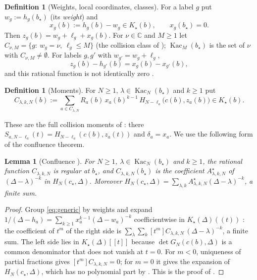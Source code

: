 \documentclass[11pt]{article}
\newtheorem{lemma}[theorem]{Lemma}
\theoremstyle{definition}
\newtheorem{definition}[theorem]{Definition}
\theoremstyle{remark}
\newcommand{\Kac}{\operatorname{Kac}}
\begin{document}
\begin{definition}[Weights, local coordinates, classes]
For a label $g$ put $w_g:=h_g(b_\star)$ (its \emph{weight}) and
\[
 x_g(b):=h_g(b)-w_g\in K_\star(b),\qquad x_g(b_\star)=0 .
\]
Then $z_g(b)=w_g+\ell_g+x_g(b)$.  For $\nu\in\mathbb C$ and $M\ge1$ let
$C_{\nu,M}=\{g:\ w_g=\nu,\ \ell_g\le M\}$ (the collision class of
\cite[Definition~3.1]{CP}); $\Kac_M(b_\star)$ is the set of $\nu$ with
$C_{\nu,M}\ne\emptyset$.  For labels $g,g'$ with $w_{g'}=w_g+\ell_g$,
\begin{equation}\label{eq:link}
 z_g(b)-h_{g'}(b)=x_g(b)-x_{g'}(b),
\end{equation}
and this rational function is not identically zero \cite[Lemma~6.3]{CP}.
\end{definition}

\begin{definition}[Moments]
For $N\ge1$, $\lambda\in\Kac_N(b_\star)$ and $k\ge1$ put
\[
 C_{\lambda,k,N}(b):=\sum_{a\in C_{\lambda,N}}R_a(b)\,x_a(b)^{k-1}\,
 H_{N-\ell_a}\bigl(c(b),z_a(b)\bigr)\in K_\star(b).
\]
\end{definition}

These are the full collision moments of \cite[Definition~7.2 and proof of
Theorem~7.3]{CP}: there $S_{a,N-\ell_a}(t)=H_{N-\ell_a}(c(b),z_a(t))$ and
$\delta_a=x_a$.  We use the following form of the confluence theorem.

\begin{lemma}[Confluence {\cite[Theorem~7.3]{CP}}]\label{lem:conf}
For $N\ge1$, $\lambda\in\Kac_N(b_\star)$ and $k\ge1$, the rational function
$C_{\lambda,k,N}$ is regular at $b_\star$, and $C_{\lambda,k,N}(b_\star)$ is the
coefficient $A^\star_{\lambda,k,N}$ of $(\Delta-\lambda)^{-k}$ in
$H_N(c_\star,\Delta)$.  Moreover
$H_N(c_\star,\Delta)=\sum_{\lambda,k}A^\star_{\lambda,k,N}(\Delta-\lambda)^{-k}$, a
finite sum.
\end{lemma}

\begin{proof}
Group \eqref{eq:generic} by weights and expand
$1/(\Delta-h_a)=\sum_{k\ge1}x_a^{k-1}(\Delta-w_a)^{-k}$ coefficientwise in
$K_\star(\Delta)((t))$ \cite[Lemma~7.4]{CP}: the coefficient of $t^m$ of the right
side is $\sum_\lambda\sum_k[t^m]C_{\lambda,k,N}\,(\Delta-\lambda)^{-k}$, a finite
sum.  The left side lies in $K_\star(\Delta)[[t]]$ because $\det G_N(c(b),\Delta)$ is
a common denominator that does not vanish at $t=0$.  For $m<0$, uniqueness of
partial fractions gives $[t^m]C_{\lambda,k,N}=0$; for $m=0$ it gives the
expansion of $H_N(c_\star,\Delta)$, which has no polynomial part by
\cite[Theorem~4.2]{CP}.  This is the proof of \cite[Theorem~7.3]{CP}.
\end{proof}
\end{document}
